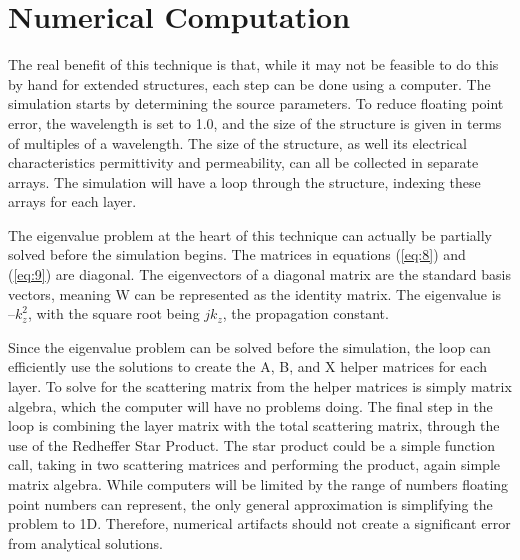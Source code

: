 \section{Numerical Computation} \label{sec:NumComp}
The real benefit of this technique is that, while it may not be feasible to do 
this by hand for extended structures, each step can be done using a computer.  
The simulation starts by determining the source parameters.  To reduce floating 
point error, the wavelength is set to 1.0, and the size of the structure is given 
in terms of multiples of a wavelength.  The size of the structure, as well its 
electrical characteristics permittivity and permeability, can all be collected 
in separate arrays.  The simulation will have a loop through the structure, 
indexing these arrays for each layer.  

 The eigenvalue problem at the heart of this technique can actually be partially 
 solved before the simulation begins.  The matrices in equations (\ref{eq:8}) and 
 (\ref{eq:9}) are diagonal.  The eigenvectors of a diagonal matrix are the 
 standard basis vectors, meaning W can be represented as the identity matrix.  
 The eigenvalue is $–k_z^2$, with the square root being $jk_z$, the propagation 
 constant.

  Since the eigenvalue problem can be solved before the simulation, the loop can 
  efficiently use the solutions to create the A, B, and X helper matrices for 
  each layer.  To solve for the scattering matrix from the helper matrices is 
  simply matrix algebra, which the computer will have no problems doing.  The 
  final step in the loop is combining the layer matrix with the total scattering 
  matrix, through the use of the Redheffer Star Product.  The star product could 
  be a simple function call, taking in two scattering matrices and performing the 
  product, again simple matrix algebra.  While computers will be limited by the 
  range of numbers floating point numbers can represent, the only general 
  approximation is simplifying the problem to 1D.  Therefore, numerical 
  artifacts should not create a significant error from analytical solutions.


